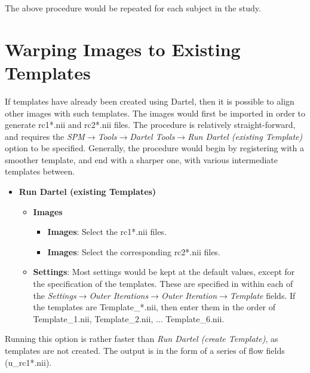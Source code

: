 The above procedure would be repeated for each subject in the study.

\section{Warping Images to Existing Templates}
If templates have already been created using Dartel, then it is possible to align other images with such templates.
The images would first be imported in order to generate rc1*.nii and rc2*.nii files.
The procedure is relatively straight-forward, and requires the \emph{SPM$\rightarrow$Tools$\rightarrow$Dartel Tools$\rightarrow$Run Dartel (existing Template)} option to be specified.
Generally, the procedure would begin by registering with a smoother template, and end with a sharper one, with various intermediate templates between.
\begin{itemize}
\item{{\bf Run Dartel (existing Templates)}
  \begin{itemize}
  \item{{\bf Images}
    \begin{itemize}
    \item{{\bf Images}: Select the rc1*.nii files.}
    \item{{\bf Images}: Select the corresponding rc2*.nii files.}
    \end{itemize}
  }
  \item{{\bf Settings}: Most settings would be kept at the default values, except for the specification of the templates.
These are specified in within each of the \emph{Settings$\rightarrow$Outer Iterations$\rightarrow$Outer Iteration$\rightarrow$Template} fields.
If the templates are Template\_*.nii, then enter them in the order of Template\_1.nii, Template\_2.nii, ... Template\_6.nii.
  }
  \end{itemize}
}
\end{itemize}

Running this option is rather faster than \emph{Run Dartel (create Template)}, as templates are not created.
The output is in the form of a series of flow fields (u\_rc1*.nii).

